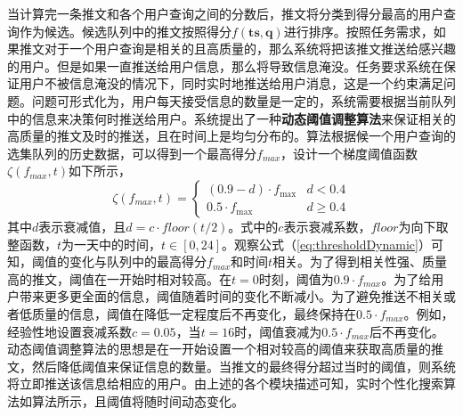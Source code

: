 当计算完一条推文和各个用户查询之间的分数后，推文将分类到得分最高的用户查询作为候选。候选队列中的推文按照得分$f\left( \mathbf{ts}, \mathbf{q} \right)$进行排序。按照任务需求，如果推文对于一个用户查询是相关的且高质量的，那么系统将把该推文推送给感兴趣的用户。但是如果一直推送给用户信息，那么将导致信息淹没。任务要求系统在保证用户不被信息淹没的情况下，同时实时地推送给用户消息，这是一个约束满足问题。问题可形式化为，用户每天接受信息的数量是一定的，系统需要根据当前队列中的信息来决策何时推送给用户。系统提出了一种\textbf{动态阈值调整算法}来保证相关的高质量的推文及时的推送，且在时间上是均匀分布的。算法根据候一个用户查询的选集队列的历史数据，可以得到一个最高得分$f_{max}$，设计一个梯度阈值函数$\zeta\left(f_{max},t\right)$如下所示，
\begin{equation}
\label{eq:thresholdDynamic}
  \zeta\left(f_{max},t\right) = \left\{ {\begin{array}{*{20}{c}}
{(0.9 - d) \cdot {f_{\max }}}&{d < 0.4}\\
{0.5 \cdot {f_{\max }}}&{d \ge 0.4}
\end{array}} \right.
\end{equation}
其中$d$表示衰减值，且$d = c \cdot floor(t/2)$。式中的$c$表示衰减系数，$floor$为向下取整函数，$t$为一天中的时间，$t \in [0,24]$。观察公式（\ref{eq:thresholdDynamic}）可知，阈值的变化与队列中的最高得分$f_{max}$和时间$t$相关。为了得到相关性强、质量高的推文，阈值在一开始时相对较高。在$t=0$时刻，阈值为$0.9 \cdot f_{max}$。为了给用户带来更多更全面的信息，阈值随着时间的变化不断减小。为了避免推送不相关或者低质量的信息，阈值在降低一定程度后不再变化，最终保持在$0.5 \cdot f_{max}$。例如，经验性地设置衰减系数$c=0.05$，当$t=16$时，阈值衰减为$0.5 \cdot f_{max}$后不再变化。动态阈值调整算法的思想是在一开始设置一个相对较高的阈值来获取高质量的推文，然后降低阈值来保证信息的数量。当推文的最终得分超过当时的阈值，则系统将立即推送该信息给相应的用户。由上述的各个模块描述可知，实时个性化搜索算法如算法所示，且阈值将随时间动态变化。
